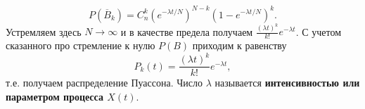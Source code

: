 \[
    P(\overline{B}_k) = C_n^k (e^{-\lambda t / N})^{N-k} (1 - e^{- \lambda t / N})^k.
\]
Устремляем здесь $N \to \infty$ и в качестве предела получаем $\frac{(\lambda t)^k}{k!} e^{-\lambda t}$. С учетом сказанного про стремление к нулю $P(B)$ приходим к равенству 
\[
    P_k(t) = \frac{(\lambda t)^k}{k!} e^{-\lambda t},
\]
т.е. получаем распределение Пуассона. Число $\lambda$ называется \textbf{интенсивностью или параметром процесса $X(t)$}.